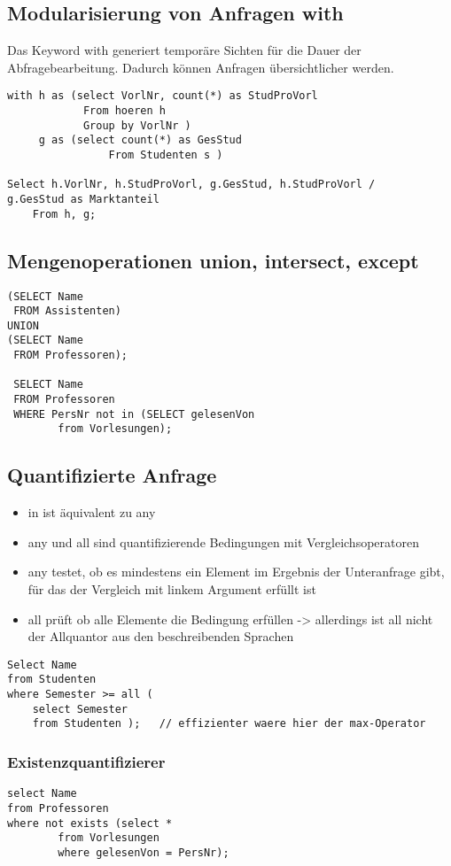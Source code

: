 \subsection{Modularisierung von Anfragen with}
Das Keyword with generiert temporäre Sichten für die Dauer der Abfragebearbeitung. Dadurch können Anfragen übersichtlicher werden. 
\begin{lstlisting}
with h as (select VorlNr, count(*) as StudProVorl
			From hoeren h
			Group by VorlNr )
     g as (select count(*) as GesStud
				From Studenten s )

Select h.VorlNr, h.StudProVorl, g.GesStud, h.StudProVorl / 
g.GesStud as Marktanteil
	From h, g;
\end{lstlisting}

\subsection{Mengenoperationen union, intersect, except}
\begin{lstlisting}
(SELECT Name			
 FROM Assistenten)			
UNION
(SELECT Name			
 FROM Professoren);
 
 SELECT Name
 FROM Professoren
 WHERE PersNr not in (SELECT gelesenVon
 		from Vorlesungen);
\end{lstlisting}

\subsection{Quantifizierte Anfrage}
\begin{itemize}
\item in ist äquivalent zu any
\item any und all sind quantifizierende Bedingungen mit Vergleichsoperatoren
\item any testet, ob es mindestens ein Element im Ergebnis der Unteranfrage gibt, für das der Vergleich mit linkem Argument erfüllt ist
\item all prüft ob alle Elemente die Bedingung erfüllen -> allerdings ist all nicht der Allquantor aus den beschreibenden Sprachen
\end{itemize}
\begin{lstlisting}
Select Name
from Studenten 
where Semester >= all ( 
	select Semester
	from Studenten );	// effizienter waere hier der max-Operator
\end{lstlisting}
\subsubsection{Existenzquantifizierer}
\begin{lstlisting}
select Name
from Professoren
where not exists (select *
		from Vorlesungen
		where gelesenVon = PersNr);
\end{lstlisting}
